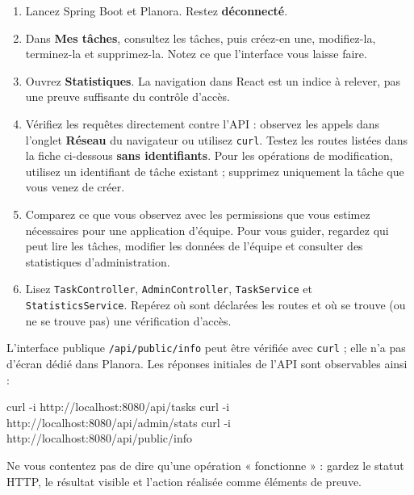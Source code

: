\documentclass[
  french,
  10pt,
  a4paper,
]{article}
\newenvironment{Shaded}{}{}
\newcommand{\AttributeTok}[1]{\textcolor[rgb]{0.49,0.56,0.16}{#1}}
\newcommand{\ExtensionTok}[1]{#1}
\newcommand{\NormalTok}[1]{#1}
\providecommand{\tightlist}{%
  \setlength{\itemsep}{0pt}\setlength{\parskip}{0pt}}
\begin{document}
\begin{enumerate}
\def\labelenumi{\arabic{enumi}.}
\tightlist
\item
  Lancez Spring Boot et Planora. Restez \textbf{déconnecté}.
\item
  Dans \textbf{Mes tâches}, consultez les tâches, puis créez-en une,
  modifiez-la, terminez-la et supprimez-la. Notez ce que l'interface
  vous laisse faire.
\item
  Ouvrez \textbf{Statistiques}. La navigation dans React est un indice à
  relever, pas une preuve suffisante du contrôle d'accès.
\item
  Vérifiez les requêtes directement contre l'API : observez les appels
  dans l'onglet \textbf{Réseau} du navigateur ou utilisez \texttt{curl}.
  Testez les routes listées dans la fiche ci-dessous \textbf{sans
  identifiants}. Pour les opérations de modification, utilisez un
  identifiant de tâche existant ; supprimez uniquement la tâche que vous
  venez de créer.
\item
  Comparez ce que vous observez avec les permissions que vous estimez
  nécessaires pour une application d'équipe. Pour vous guider, regardez
  qui peut lire les tâches, modifier les données de l'équipe et
  consulter des statistiques d'administration.
\item
  Lisez \texttt{TaskController}, \texttt{AdminController},
  \texttt{TaskService} et \texttt{StatisticsService}. Repérez où sont
  déclarées les routes et où se trouve (ou ne se trouve pas) une
  vérification d'accès.
\end{enumerate}

L'interface publique \texttt{/api/public/info} peut être vérifiée avec
\texttt{curl} ; elle n'a pas d'écran dédié dans Planora. Les réponses
initiales de l'API sont observables ainsi :

\begin{Shaded}
\begin{Highlighting}[]
\ExtensionTok{curl} \AttributeTok{{-}i}\NormalTok{ http://localhost:8080/api/tasks}
\ExtensionTok{curl} \AttributeTok{{-}i}\NormalTok{ http://localhost:8080/api/admin/stats}
\ExtensionTok{curl} \AttributeTok{{-}i}\NormalTok{ http://localhost:8080/api/public/info}
\end{Highlighting}
\end{Shaded}

Ne vous contentez pas de dire qu'une opération « fonctionne » : gardez
le statut HTTP, le résultat visible et l'action réalisée comme éléments
de preuve.
\end{document}
